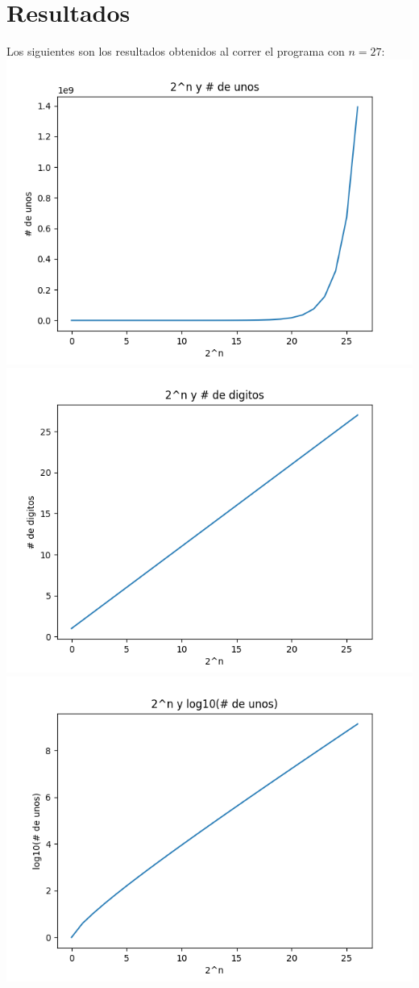 \documentclass{article}
\begin{document}
\section{Resultados}

Los siguientes son los resultados obtenidos al correr el programa con $n = 27$:
\includegraphics{Graph1.png}
\includegraphics{Graph2.png}
\includegraphics{Graph3.png}
\end{document}
